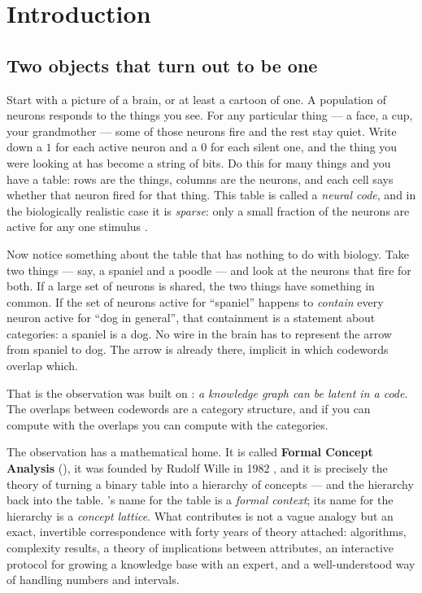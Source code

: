 \section{Introduction}
\label{sec:intro}

\subsection{Two objects that turn out to be one}

Start with a picture of a brain, or at least a cartoon of one. A population of
neurons responds to the things you see. For any particular thing --- a face, a
cup, your grandmother --- some of those neurons fire and the rest stay quiet.
Write down a $1$ for each active neuron and a $0$ for each silent one, and the
thing you were looking at has become a string of bits. Do this for many things
and you have a table: rows are the things, columns are the neurons, and each
cell says whether that neuron fired for that thing. This table is called a
\emph{neural code}, and in the biologically realistic case it is
\emph{sparse}: only a small fraction of the neurons are active for any one
stimulus \citep{barlow1972,foldiak1990,olshausen1996}.

Now notice something about the table that has nothing to do with biology. Take
two things --- say, a spaniel and a poodle --- and look at the neurons that
fire for both. If a large set of neurons is shared, the two things have
something in common. If the set of neurons active for ``spaniel'' happens to
\emph{contain} every neuron active for ``dog in general'', that containment is
a statement about categories: a spaniel is a dog. No wire in the brain has to
represent the arrow from spaniel to dog. The arrow is already there, implicit
in which codewords overlap which.

That is the observation \odag{} was built on \citep{foldiak2003,ontodag}:
\emph{a knowledge graph can be latent in a code}. The overlaps between
codewords are a category structure, and if you can compute with the overlaps
you can compute with the categories.

The observation has a mathematical home. It is called \textbf{Formal Concept
Analysis} (\fca{}), it was founded by Rudolf Wille in 1982
\citep{wille1982,ganter1999}, and it is precisely the theory of turning a
binary table into a hierarchy of concepts --- and the hierarchy back into the
table. \fca{}'s name for the table is a \emph{formal context}; its name for
the hierarchy is a \emph{concept lattice}. What \fca{} contributes is not a
vague analogy but an exact, invertible correspondence with forty years of
theory attached: algorithms, complexity results, a theory of implications
between attributes, an interactive protocol for growing a knowledge base with
an expert, and a well-understood way of handling numbers and intervals.

